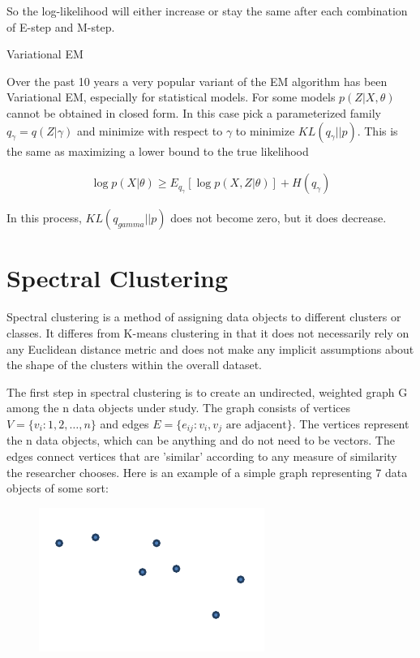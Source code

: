 \documentclass[11pt]{article}
\begin{document}
So the log-likelihood will either increase or stay the same after each combination of E-step and M-step.

Variational EM

Over the past 10 years a very popular variant of the EM algorithm has been Variational EM, especially for statistical models.  For some models $p(Z|X,\theta)$ cannot be obtained in closed form.  In this case pick a parameterized family $q_{\gamma}=q(Z|\gamma)$ and minimize with respect to $\gamma$ to minimize $KL(q_{\gamma}||p)$.  This is the same as maximizing a lower bound to the true likelihood

\begin{align*}
\log p(X|\theta) \geq E_{q_{\gamma}}[\log p(X,Z|\theta)] + H(q_{\gamma})
\end{align*}

In this process, $KL(q_{gamma}||p)$ does not become zero, but it does decrease.

\section{Spectral Clustering}
Spectral clustering is a method of assigning data objects to different clusters or classes.  It differes from K-means clustering in that it does not necessarily rely on any Euclidean distance metric and does not make any implicit assumptions about the shape of the clusters within the overall dataset.

The first step in spectral clustering is to create an undirected, weighted graph G among the n data objects under study.  The graph consists of vertices $V=\{v_i:1,2,\dots,n\}$ and edges $E=\{e_{ij}:v_i, v_j \text{ are adjacent}\}$.  The vertices represent the n data objects, which can be anything and do not need to be vectors.  The edges connect vertices that are 'similar' according to any measure of similarity the researcher chooses.  Here is an example of a simple graph representing 7 data objects of some sort:

\begin{figure}
\includegraphics{graph_0}
\caption{}
\end{figure}
\end{document}
